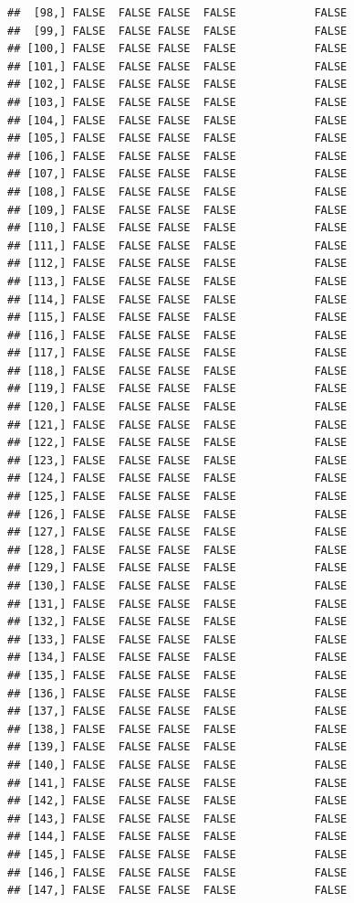 \documentclass[
  english,
  man,floatsintext]{apa6}
\begin{document}
\begin{verbatim}
##  [98,] FALSE  FALSE FALSE  FALSE            FALSE
##  [99,] FALSE  FALSE FALSE  FALSE            FALSE
## [100,] FALSE  FALSE FALSE  FALSE            FALSE
## [101,] FALSE  FALSE FALSE  FALSE            FALSE
## [102,] FALSE  FALSE FALSE  FALSE            FALSE
## [103,] FALSE  FALSE FALSE  FALSE            FALSE
## [104,] FALSE  FALSE FALSE  FALSE            FALSE
## [105,] FALSE  FALSE FALSE  FALSE            FALSE
## [106,] FALSE  FALSE FALSE  FALSE            FALSE
## [107,] FALSE  FALSE FALSE  FALSE            FALSE
## [108,] FALSE  FALSE FALSE  FALSE            FALSE
## [109,] FALSE  FALSE FALSE  FALSE            FALSE
## [110,] FALSE  FALSE FALSE  FALSE            FALSE
## [111,] FALSE  FALSE FALSE  FALSE            FALSE
## [112,] FALSE  FALSE FALSE  FALSE            FALSE
## [113,] FALSE  FALSE FALSE  FALSE            FALSE
## [114,] FALSE  FALSE FALSE  FALSE            FALSE
## [115,] FALSE  FALSE FALSE  FALSE            FALSE
## [116,] FALSE  FALSE FALSE  FALSE            FALSE
## [117,] FALSE  FALSE FALSE  FALSE            FALSE
## [118,] FALSE  FALSE FALSE  FALSE            FALSE
## [119,] FALSE  FALSE FALSE  FALSE            FALSE
## [120,] FALSE  FALSE FALSE  FALSE            FALSE
## [121,] FALSE  FALSE FALSE  FALSE            FALSE
## [122,] FALSE  FALSE FALSE  FALSE            FALSE
## [123,] FALSE  FALSE FALSE  FALSE            FALSE
## [124,] FALSE  FALSE FALSE  FALSE            FALSE
## [125,] FALSE  FALSE FALSE  FALSE            FALSE
## [126,] FALSE  FALSE FALSE  FALSE            FALSE
## [127,] FALSE  FALSE FALSE  FALSE            FALSE
## [128,] FALSE  FALSE FALSE  FALSE            FALSE
## [129,] FALSE  FALSE FALSE  FALSE            FALSE
## [130,] FALSE  FALSE FALSE  FALSE            FALSE
## [131,] FALSE  FALSE FALSE  FALSE            FALSE
## [132,] FALSE  FALSE FALSE  FALSE            FALSE
## [133,] FALSE  FALSE FALSE  FALSE            FALSE
## [134,] FALSE  FALSE FALSE  FALSE            FALSE
## [135,] FALSE  FALSE FALSE  FALSE            FALSE
## [136,] FALSE  FALSE FALSE  FALSE            FALSE
## [137,] FALSE  FALSE FALSE  FALSE            FALSE
## [138,] FALSE  FALSE FALSE  FALSE            FALSE
## [139,] FALSE  FALSE FALSE  FALSE            FALSE
## [140,] FALSE  FALSE FALSE  FALSE            FALSE
## [141,] FALSE  FALSE FALSE  FALSE            FALSE
## [142,] FALSE  FALSE FALSE  FALSE            FALSE
## [143,] FALSE  FALSE FALSE  FALSE            FALSE
## [144,] FALSE  FALSE FALSE  FALSE            FALSE
## [145,] FALSE  FALSE FALSE  FALSE            FALSE
## [146,] FALSE  FALSE FALSE  FALSE            FALSE
## [147,] FALSE  FALSE FALSE  FALSE            FALSE

\end{verbatim}
\end{document}
